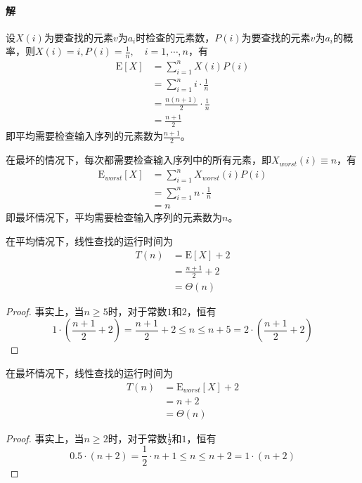 \documentclass{article}
\begin{document}
\paragraph{解}
设$X(i)$为要查找的元素$v$为$a_i$时检查的元素数，$P(i)$为要查找的元素$v$为$a_i$的概率，则$X(i)=i,P(i)=\displaystyle \frac{1}{n},\quad i=1,\cdots,n$，有
\begin{align*}
    \mathrm{E}[X]&=\sum_{i=1}^n{X(i)P(i)} \\
    &=\sum_{i=1}^n{i \cdot \frac{1}{n}} \\
    &=\frac{n(n+1)}{2}\cdot\frac{1}{n} \\
    &=\frac{n+1}{2}
\end{align*}
即平均需要检查输入序列的元素数为$\displaystyle \frac{n+1}{2}$。\par
在最坏的情况下，每次都需要检查输入序列中的所有元素，即$X_{worst}(i) \equiv n$，有
\begin{align*}
    \mathrm{E}_{worst}[X]&=\sum_{i=1}^n{X_{worst}(i)P(i)} \\
    &=\sum_{i=1}^n{n \cdot \frac{1}{n}} \\
    &=n
\end{align*}
即最坏情况下，平均需要检查输入序列的元素数为$n$。\par
在平均情况下，线性查找的运行时间为
\begin{align*}
    T(n)&=\mathrm{E}[X]+2 \\
    &=\frac{n+1}{2} +2 \\
    &=\Theta(n)
\end{align*} \par
\begin{proof}
    事实上，当$n \geq 5$时，对于常数$1$和$2$，恒有
    \begin{equation*}
    1 \cdot (\frac{n+1}{2}+2)=\frac{n+1}{2} + 2 \leq n \leq n+5= 2 \cdot (\frac{n+1}{2}+2)
\end{equation*}
\end{proof} \par
在最坏情况下，线性查找的运行时间为
\begin{align*}
    T(n)&=\mathrm{E}_{worst}[X]+2 \\
    &=n+2 \\
    &=\Theta(n)
\end{align*} \par
\begin{proof}
    事实上，当$n \geq 2$时，对于常数$\displaystyle \frac{1}{2}$和$1$，恒有
\begin{equation*}
    0.5\cdot(n+2)=\frac{1}{2}\cdot n + 1 \leq n \leq n+2= 1\cdot(n+2)
\end{equation*}
\end{proof} \par
\end{document}
